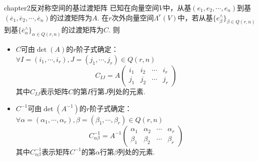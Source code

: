 \begin{mythm}{}{chapter2反对称空间的基过渡矩阵}
	已知在向量空间$V$中，从基$(e_{1},e_{2},\cdots,e_{n})$到基$(\overline{e}_{1},\overline{e}_{2},\cdots,\overline{e}_{n})$的过渡矩阵为$A$. 在$r$次外向量空间$\Lambda^{r}(V)$中，若从基$\{e^{\wedge}_{\beta} \}_{\beta\in Q(r,n) } $到基$\{ \overline{e}^{\wedge}_{\alpha}\}_{\alpha\in Q(r,n)}$的过渡矩阵为$C$. 则
	\begin{itemize}
	\item $C$可由$\operatorname{det}(A)$的$r$阶子式确定：$\forall I=(i_{1},\cdots,i_{r}),J=(j_{1},\cdots,j_{r})\in Q(r,n)$
	\[
	C_{IJ}=A\left(\begin{array}{cccc}i_{1} & i_{2} & \cdots & i_{r} \\j_{1} & j_{2} & \cdots & j_{r}\end{array}\right)
	\]
	其中$C_{IJ}$表示矩阵$C$的第$I$行第$J$列处的元素.
	\item $C^{-1}$可由$\operatorname{det}(A^{-1})$的$r$阶子式确定：$\forall \alpha=(\alpha_{1},\cdots,\alpha_{r}),\beta=(\beta_{1},\cdots,\beta_{r})\in Q(r,n)$
	\[
	C^{-1}_{\alpha\beta}=A^{-1}\left(\begin{array}{cccc}\alpha_{1} & \alpha_{2} & \cdots & \alpha_{r} \\\beta_{1} & \beta_{2} & \cdots & \beta_{r}\end{array}\right)
	\]
	其中$C^{-1}_{\alpha\beta}$表示矩阵$C^{-1}$的第$\alpha$行第$\beta$列处的元素.
	\end{itemize}
\end{mythm}

